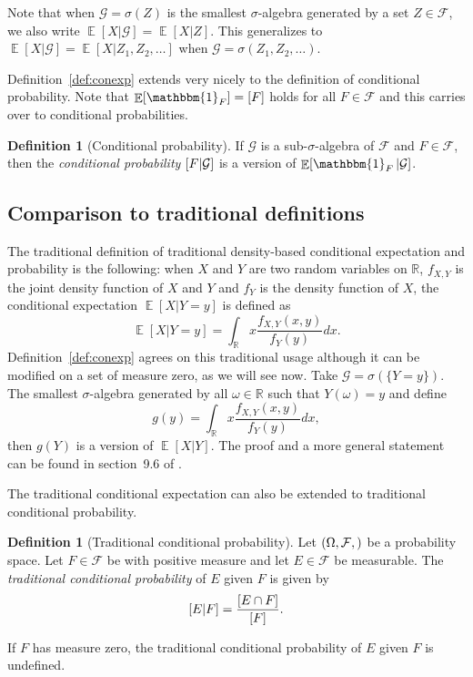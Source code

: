 \documentclass[a4paper]{report}
\theoremstyle{plain}
\theoremstyle{definition}
\newtheorem{definition}[theorem]{Definition}
\theoremstyle{remark}
\numberwithin{equation}{chapter}
\newcommand{\R}{\mathbb{R}}
\let\P\relax
\DeclareMathOperator{\P}{\mathbb{P}}
\DeclareMathOperator{\E}{\mathbb{E}}
\DeclareMathOperator{\1}{\mathbbm{1}}
\newcommand{\F}{\mathcal{F}}
\renewcommand{\G}{\mathcal{G}}
\begin{document}
Note that when $\G=\sigma(Z)$ is the smallest $\sigma$-algebra generated by a set $Z\in\F$, we also write $\E[X|\G]=\E[X|Z]$. This generalizes to $\E[X|\G]=\E[X|Z_1,Z_2,\ldots]$ when $\G=\sigma(Z_1,Z_2,\ldots)$.

Definition~\ref{def:conexp} extends very nicely to the definition of conditional probability. Note that $\E[\1_F]=\P[F]$ holds for all $F\in\F$ and this carries over to conditional probabilities.

\begin{definition}[Conditional probability]
If $\G$ is a sub-$\sigma$-algebra of $\F$ and $F\in\F$, then the \emph{conditional probability} $\P[F|\G]$ is a version of $\E[\1_F|\G]$.
\end{definition}

\subsection{Comparison to traditional definitions}
The traditional definition of traditional density-based conditional expectation and probability is the following: when $X$ and $Y$ are two random variables on $\R$, $f_{X,Y}$ is the joint density function of $X$ and $Y$ and $f_Y$ is the density function of $X$, the conditional expectation $\E[X|Y=y]$ is defined as
\begin{equation}
\E[X|Y=y]=\int_\R x\frac{f_{X,Y}(x,y)}{f_Y(y)}dx.
\end{equation}
Definition~\ref{def:conexp} agrees on this traditional usage although it can be modified on a set of measure zero, as we will see now. Take $\G=\sigma(\{Y=y\})$. The smallest $\sigma$-algebra generated by all $\omega\in\R$ such that $Y(\omega)=y$ and define
\begin{equation}
g(y)=\int_\R x\frac{f_{X,Y}(x,y)}{f_Y(y)}dx,
\end{equation}
then $g(Y)$ is a version of $\E[X|Y]$. The proof and a more general statement can be found in section~9.6 of \cite{Williams91}.

The traditional conditional expectation can also be extended to traditional conditional probability.
\begin{definition}[Traditional conditional probability]
Let $(\Omega,\F, \P)$ be a probability space. Let $F\in\F$ be with positive measure and let $E\in\F$ be measurable. The \emph{traditional conditional probability} of $E$ given $F$ is given by
\begin{equation}
\P[E|F]=\frac{\P[E\cap F]}{\P[F]}.
\end{equation}

If $F$ has measure zero, the traditional conditional probability of $E$ given $F$ is undefined.
\end{definition}
\end{document}
